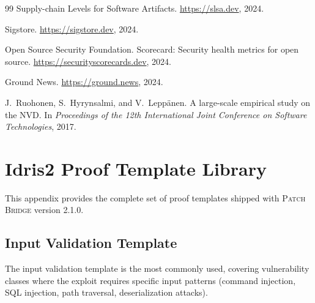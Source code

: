 \documentclass[11pt,twocolumn]{article}
\begin{document}
\begin{thebibliography}{99}
Supply-chain Levels for Software Artifacts.
\newblock \url{https://slsa.dev}, 2024.

Sigstore.
\newblock \url{https://sigstore.dev}, 2024.

Open Source Security Foundation.
\newblock Scorecard: Security health metrics for open source.
\newblock \url{https://securityscorecards.dev}, 2024.

Ground News.
\newblock \url{https://ground.news}, 2024.

J.~Ruohonen, S.~Hyrynsalmi, and V.~Lepp\"{a}nen.
\newblock A large-scale empirical study on the NVD.
\newblock In \emph{Proceedings of the 12th International Joint Conference on Software Technologies}, 2017.

\end{thebibliography}

\appendix

\section{Idris2 Proof Template Library}
\label{app:templates}

This appendix provides the complete set of proof templates shipped
with \textsc{Patch Bridge} version 2.1.0.

\subsection{Input Validation Template}

The input validation template is the most commonly used, covering
vulnerability classes where the exploit requires specific input
patterns (command injection, SQL injection, path traversal,
deserialization attacks).
\end{document}
